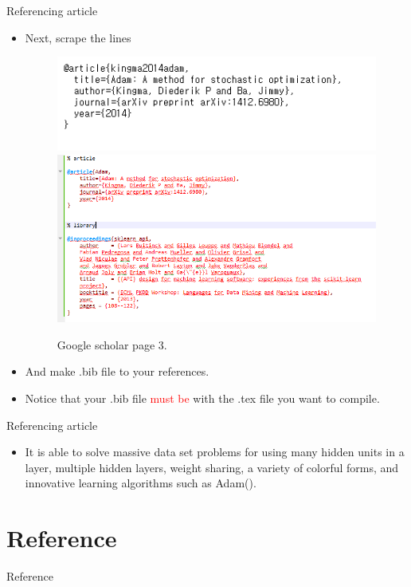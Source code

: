 \documentclass{beamer}
\begin{document}
\begin{frame}{Referencing article}
\begin{itemize}
	\item Next, scrape the lines
	\begin{figure}[h]
		\centering
		\includegraphics[scale=0.4]{google_scholar3.png}
		\includegraphics[scale=0.3]{google_scholar4.png}
		\caption{Google scholar page 3.}
		\label{fig:fig3}
	\end{figure}
	\item And make .bib file to your references.
	\item Notice that your .bib file \textcolor{red}{must be} with the .tex file you want to compile.
\end{itemize}
\end{frame}
\begin{frame}{Referencing article}
\begin{itemize}
	\item It is able to solve massive data set problems for using many hidden units in a layer, multiple hidden layers, weight sharing, a variety of colorful forms, and innovative learning algorithms such as Adam(\cite{Adam}).
\end{itemize}
\end{frame}

\section{Reference}
\begin{frame}{Reference}

\end{frame}
\end{document}
